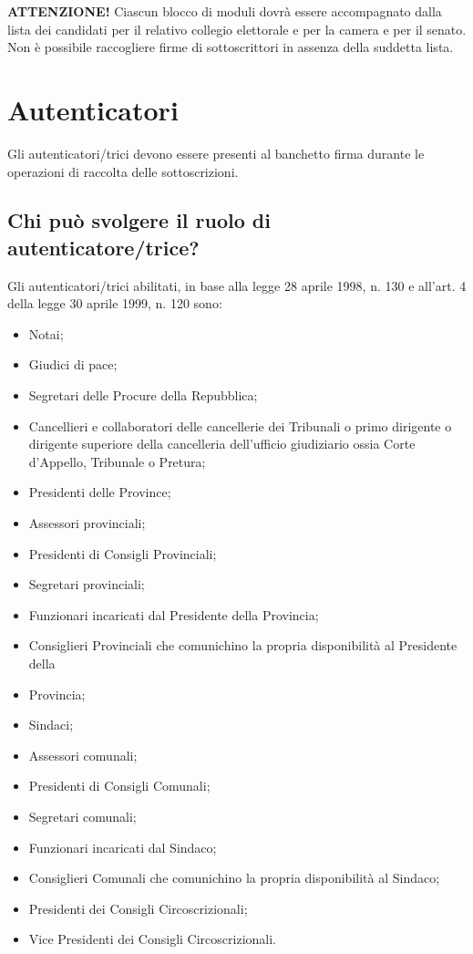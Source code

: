 \documentclass[paper=a4,11pt]{scrartcl}
\begin{document}
\begin{leftbar}\textbf{ATTENZIONE!} Ciascun blocco di moduli dovrà essere accompagnato dalla lista dei candidati 
per il relativo collegio elettorale e per la camera e per il senato. Non è 
possibile raccogliere firme di sottoscrittori in assenza della suddetta lista.\end{leftbar}

\section{Autenticatori}
Gli autenticatori/trici devono essere presenti al banchetto firma durante le 
operazioni di raccolta delle sottoscrizioni.

\subsection{Chi può svolgere il ruolo di autenticatore/trice?}
Gli autenticatori/trici abilitati, in base alla legge 28 aprile 1998, n. 130 e 
all'art. 4 della legge 30 aprile
1999, n. 120 sono:
\begin{itemize}
\item Notai;
\item Giudici di pace;
\item Segretari delle Procure della Repubblica;
\item Cancellieri e collaboratori delle cancellerie dei Tribunali o primo 
dirigente o dirigente superiore
della cancelleria dell'ufficio giudiziario ossia Corte d'Appello, Tribunale o 
Pretura;
\item Presidenti delle Province;
\item Assessori provinciali;
\item Presidenti di Consigli Provinciali;
\item Segretari provinciali;
\item Funzionari incaricati dal Presidente della Provincia;
\item Consiglieri Provinciali che comunichino la propria disponibilità al 
Presidente della
\item Provincia;
\item Sindaci;
\item Assessori comunali;
\item Presidenti di Consigli Comunali;
\item Segretari comunali;
\item Funzionari incaricati dal Sindaco;
\item Consiglieri Comunali che comunichino la propria disponibilità al Sindaco;
\item Presidenti dei Consigli Circoscrizionali;
\item Vice Presidenti dei Consigli Circoscrizionali.
\end{itemize}
\end{document}
